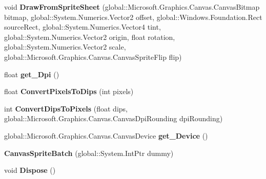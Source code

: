 \begin{DoxyCompactItemize}
void {\bfseries Draw\+From\+Sprite\+Sheet} (global\+::\+Microsoft.\+Graphics.\+Canvas.\+Canvas\+Bitmap bitmap, global\+::\+System.\+Numerics.\+Vector2 offset, global\+::\+Windows.\+Foundation.\+Rect source\+Rect, global\+::\+System.\+Numerics.\+Vector4 tint, global\+::\+System.\+Numerics.\+Vector2 origin, float rotation, global\+::\+System.\+Numerics.\+Vector2 scale, global\+::\+Microsoft.\+Graphics.\+Canvas.\+Canvas\+Sprite\+Flip flip)
\item 
\mbox{\label{class_microsoft_1_1_graphics_1_1_canvas_1_1_canvas_sprite_batch_ac7c3fcb4f10743d465779d1001600913}} 
float {\bfseries get\+\_\+\+Dpi} ()
\item 
\mbox{\label{class_microsoft_1_1_graphics_1_1_canvas_1_1_canvas_sprite_batch_a892b10eda90f5263ebc1628954d0baf9}} 
float {\bfseries Convert\+Pixels\+To\+Dips} (int pixels)
\item 
\mbox{\label{class_microsoft_1_1_graphics_1_1_canvas_1_1_canvas_sprite_batch_ad29355a30ec2c41afbec5c8728561010}} 
int {\bfseries Convert\+Dips\+To\+Pixels} (float dips, global\+::\+Microsoft.\+Graphics.\+Canvas.\+Canvas\+Dpi\+Rounding dpi\+Rounding)
\item 
\mbox{\label{class_microsoft_1_1_graphics_1_1_canvas_1_1_canvas_sprite_batch_a6a382f246e096c28933db88bf3b579f7}} 
global\+::\+Microsoft.\+Graphics.\+Canvas.\+Canvas\+Device {\bfseries get\+\_\+\+Device} ()
\item 
\mbox{\label{class_microsoft_1_1_graphics_1_1_canvas_1_1_canvas_sprite_batch_a81340af827697e7a6d22bf42fc032c21}} 
{\bfseries Canvas\+Sprite\+Batch} (global\+::\+System.\+Int\+Ptr dummy)
\item 
\mbox{\label{class_microsoft_1_1_graphics_1_1_canvas_1_1_canvas_sprite_batch_af897e58d6cf8ed4ca4efaee7c5f9a12a}} 
void {\bfseries Dispose} ()
\item 
\mbox{\label{class_microsoft_1_1_graphics_1_1_canvas_1_1_canvas_sprite_batch_a5b0eff0bf7714bbaebd5c698e9a4926d}} 

\end{DoxyCompactItemize}
